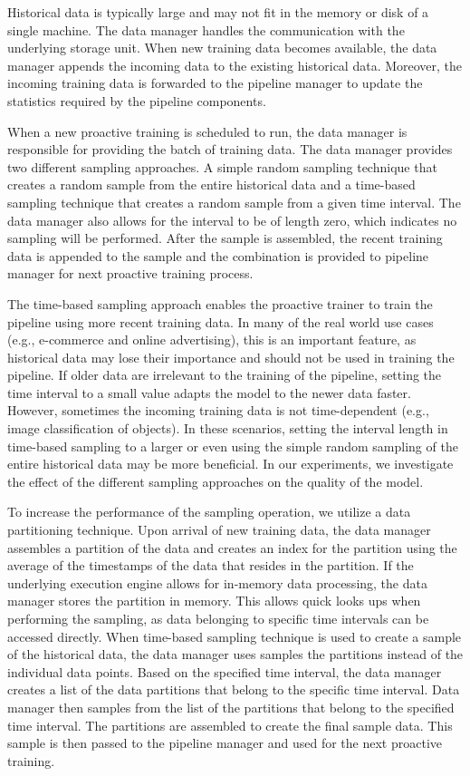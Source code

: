 Historical data is typically large and may not fit in the memory or disk of a single machine. 
The data manager handles the communication with the underlying storage unit.
When new training data becomes available, the data manager appends the incoming data to the existing historical data.
Moreover, the incoming training data is forwarded to the pipeline manager to update the statistics required by the pipeline components.

When a new proactive training is scheduled to run, the data manager is responsible for providing the batch of training data.
The data manager provides two different sampling approaches.
A simple random sampling technique that creates a random sample from the entire historical data and a time-based sampling technique that creates a random sample from a given time interval.
The data manager also allows for the interval to be of length zero, which indicates no sampling will be performed.
After the sample is assembled, the recent training data is appended to the sample and the combination is provided to pipeline manager for next proactive training process.

The time-based sampling approach enables the proactive trainer to train the pipeline using more recent training data.
In many of the real world use cases (e.g., e-commerce and online advertising), this is an important feature, as historical data may lose their importance and should not be used in training the pipeline.
If older data are irrelevant to the training of the pipeline, setting the time interval to a small value adapts the model to the newer data faster.
However, sometimes the incoming training data is not time-dependent (e.g., image classification of objects).
In these scenarios, setting the interval length in time-based sampling to a larger or even using the simple random sampling of the entire historical data may be more beneficial.
In our experiments, we investigate the effect of the different sampling approaches on the quality of the model.

To increase the performance of the sampling operation, we utilize a data partitioning technique.
Upon arrival of new training data, the data manager assembles a partition of the data and creates an index for the partition using the average of the timestamps of the data that resides in the partition.
If the underlying execution engine allows for in-memory data processing, the data manager stores the partition in memory.
This allows quick looks ups when performing the sampling, as data belonging to specific time intervals can be accessed directly.
When time-based sampling technique is used to create a sample of the historical data, the data manager uses samples the partitions instead of the individual data points.
Based on the specified time interval, the data manager creates a list of the data partitions that belong to the specific time interval.
Data manager then samples from the list of the partitions that belong to the specified time interval.
The partitions are assembled to create the final sample data.
This sample is then passed to the pipeline manager and used for the next proactive training.

